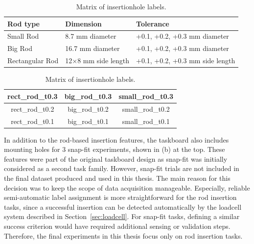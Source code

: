 \begin{table}[htbp]
    \centering
    \caption{Insertion features and tolerance levels implemented in the taskboard.}
    \label{tab:taskboard_tolerances}

    \begin{subtable}[t]{\textwidth}
        \centering
        \caption{Rod geometries and tolerance levels.}
        \begin{tabular}{lll}
            \hline
            Rod type & Dimension & Tolerance \\
            \hline
            Small Rod & 8.7 mm diameter & +0.1, +0.2, +0.3 mm diameter \\
            Big Rod & 16.7 mm diameter & +0.1, +0.2, +0.3 mm diameter \\
            Rectangular Rod & 12$\times$8 mm side length & +0.1, +0.2, +0.3 mm side length \\
            \hline
        \end{tabular}
        \label{tab:taskboard_tolerances_a}
    \end{subtable}

    \vspace{1.5em}

    \begin{subtable}[t]{\textwidth}
        \centering
        \caption{Matrix of insertionhole labels.}
        \begin{tabular}{|c|c|c|}
            \hline
            rect\_rod\_t0.3 & big\_rod\_t0.3 & small\_rod\_t0.3 \\
            \hline
            rect\_rod\_t0.2 & big\_rod\_t0.2 & small\_rod\_t0.2 \\
            \hline
            rect\_rod\_t0.1 & big\_rod\_t0.1 & small\_rod\_t0.1 \\
            \hline
        \end{tabular}
        \label{tab:taskboard_tolerances_b}
    \end{subtable}
\end{table}

In addition to the rod-based insertion features, the taskboard also includes mounting holes for 3 snap-fit experiments, shown in  (b) at the top. These features were part of the original taskboard design as snap-fit was initially considered as a second task family. However, snap-fit trials are not included in the final dataset produced and used in this thesis. The main reason for this decision was to keep the scope of data acquisition manageable. Especially, reliable semi-automatic label assignment is more straightforward for the rod insertion tasks, since a successful insertion can be detected automatically by the loadcell system described in Section~\ref{sec:loadcell}. For snap-fit tasks, defining a similar success criterion would have required additional sensing or validation steps. Therefore, the final experiments in this thesis focus only on rod insertion tasks.

